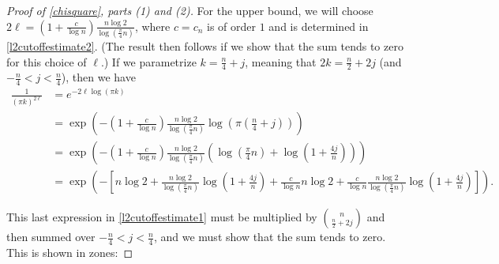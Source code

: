 \documentclass[11pt]{article}
\newcounter{r}
\newcounter{s}
\numberwithin{equation}{section}
\begin{document}
\begin{proof}[Proof of \cref{chisquare}, parts (1) and (2)]
\medskip

For the upper bound, we will choose $2\ell = \left(1 + \frac{c}{\log n}\right) \frac{n \log 2}{\log (\frac{\pi}{4}n)}$, where $c = c_n$ is of order $1$ and is determined in \cref{l2cutoffestimate2}. (The result then follows if we show that the sum tends to zero for this choice of $\ell$.) If we parametrize $k = \frac{n}{4} + j$, meaning that $2k = \frac{n}{2} + 2j$ (and $-\frac{n}{4} < j < \frac{n}{4}$), then we have
\begin{align}\label{l2cutoffestimate1}
\frac{1}{(\pi k)^{2\ell}} &= e^{-2\ell \log(\pi k)} \nonumber \\
&= \exp\left(-\left(1 + \frac{c}{\log n}\right) \frac{n \log 2}{\log \left(\frac{\pi}{4}n\right)} \log \left(\pi\left(\frac{n}{4} + j\right)\right) \right) \nonumber \\
&= \exp\left(-\left(1 + \frac{c}{\log n}\right) \frac{n \log 2}{\log \left(\frac{\pi}{4}n\right)} \left(\log \left(\frac{\pi}{4} n\right) + \log\left(1 + \frac{4j}{n}\right)\right)\right) \nonumber \\
&= \exp\left(-\left[n \log 2 + \frac{n \log 2}{\log\left(\frac{\pi}{4}n\right)}\log\left(1 + \frac{4j}{n}\right) + \frac{c}{\log n} n \log 2 + \frac{c}{\log n}  \frac{n \log 2}{\log\left(\frac{\pi}{4}n\right)}\log\left(1 + \frac{4j}{n}\right)\right]\right).
\end{align}

This last expression in \cref{l2cutoffestimate1} must be multiplied by $\binom{n}{\frac{n}{2} + 2j}$ and then summed over $-\frac{n}{4} < j < \frac{n}{4}$, and we must show that the sum tends to zero. This is shown in zones:


\end{proof}
\end{document}
